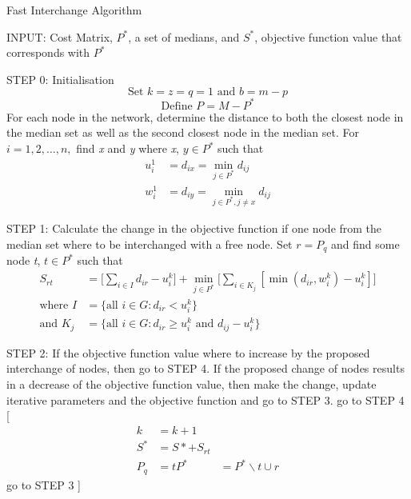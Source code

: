 \documentclass[11pt]{article}
\begin{document}
\begin{algorithm}
	\caption{Fast Interchange Algorithm}
	\begin{algorithmic}[0]
		\Statex 
		\Statex INPUT: Cost Matrix, $P^*$, a set of medians, and $S^*$, objective function value that corresponds with $P^*$
		
		\Statex 
		\Statex STEP 0: Initialisation
		\begin{equation*}
		\text{Set } k = z = q = 1 \text{ and } b=m-p
		\end{equation*}
		\begin{equation*}
		\text{Define } P=M-P^*
		\end{equation*}
		\Statex For each node in the network, determine the distance to both the closest node in the median set as well as the second closest node in the median set.
		\Statex For $i=1,2,\dots,n ,$ find \emph{x} and \emph{y} where \emph{x}, $y \in P^*$ such that
		\begin{align*}
		u_i^1 & = d_{ix} = \min_{j\in P^*}d_{ij}\\
		w_i^1 & = d_{iy} = \min_{j\in P^*, j\neq x}d_{ij}
		\end{align*}
		
		\Statex
		\Statex STEP 1: Calculate the change in the objective function if one node from the median set where to be interchanged with a free node.
		\Statex Set $r=P_q$ and find some node \emph{t}, $t \in P^*$ such that
		\begin{align*}
		S_{rt} &= \big[\sum_{i \in I}d_{ir}-u_i^k\big] + \min_{j\in P^*}\big[\sum_{i \in K_j}[\min(d_{ir}, w_i^k)-u_i^k]\big]\\
		\text{where } I &= \{\text{all } i \in G: d_{ir}<u_i^k\}\\
		\text{and } K_j &= \{\text{all } i \in G: d_{ir}\geq u_i^k\text{ and } d_{ij} - u_i^k\}
		\end{align*}
		
		\Statex
		\Statex STEP 2: If the objective function value where to increase by the proposed interchange of nodes, then go to STEP 4.  If the proposed change of nodes results in a decrease of the objective function value, then make the change, update iterative parameters and the objective function and go to STEP 3.
		\Statex go to STEP 4
		[
		\begin{align*}
		k &= k+1\\
		S^* &= S* + S_{rt}\\
		P_q &= t
		P^* & = P^*\backslash {t} \cup {r}		
		\end{align*}
		\Statex go to STEP 3				
		]
		\EndIf
		

\end{algorithmic}
\end{algorithm}
\end{document}
